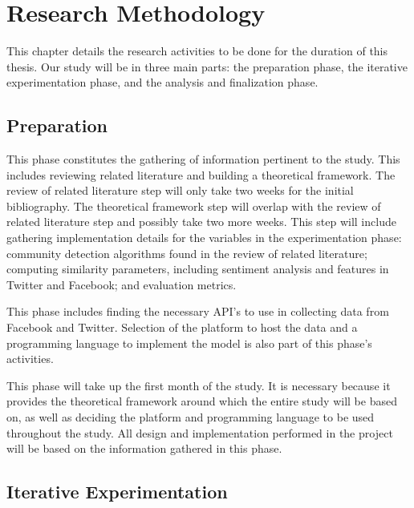 %
%
%                 

\chapter{Research Methodology}
This chapter details the research activities to be done for the duration of this thesis. Our study will be in three main parts: the preparation phase, the iterative experimentation phase, and the analysis and finalization phase.

\section{Preparation}

This phase constitutes the gathering of information pertinent to the study. This includes reviewing related literature and building a theoretical framework. The review of related literature step will only take two weeks for the initial bibliography. The theoretical framework step will overlap with the review of related literature step and possibly take two more weeks. This step will include gathering implementation details for the variables in the experimentation phase: community detection algorithms found in the review of related literature; computing similarity parameters, including sentiment analysis and features in Twitter and Facebook; and evaluation metrics. 

This phase includes finding the necessary API’s to use in collecting data from Facebook and Twitter. Selection of the platform to host the data and a programming language to implement the model is also part of this phase's activities. 

This phase will take up the first month of the study. It is necessary because it provides the theoretical framework around which the entire study will be based on, as well as deciding the platform and programming language to be used throughout the study. All design and implementation performed in the project will be based on the information gathered in this phase.

\section{Iterative Experimentation}

